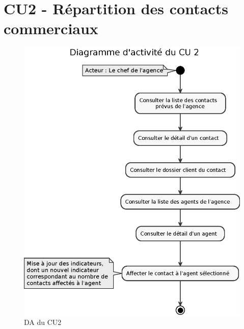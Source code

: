 \section{CU2 - Répartition des contacts commerciaux}

\begin{figure}[H]
\centering
\includegraphics[width=\textwidth]{figures/eps/DA_CU2.eps}
\caption{DA du CU2}
\end{figure}


